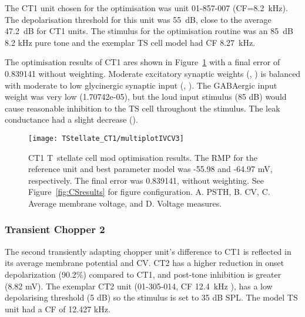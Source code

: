 The CT1 unit chosen for the optimisation was unit 01-857-007 \citep{PaoliniClareyEtAl:2005} (CF=8.2~kHz).
The depolarisation threshold for this unit was 55~dB, close to the average 47.2~dB for CT1 units.
The stimulus for the optimisation routine was an 85~dB 8.2 kHz pure tone and the exemplar TS cell model had CF 8.27~kHz.

The optimisation results of CT1 ares shown in Figure~\ref{fig:CT1results} with a final error of 0.839141 without weighting.
Moderate excitatory synaptic weights (, ) is balanced with moderate to low glycinergic synaptic input (, ).
The GABAergic input weight was very low (\wGLGTS 1.70742e-05), but the loud input stimulus (85 dB) would cause reasonable inhibition to the TS cell throughout the stimulus.
The leak conductance had a slight decrease ().


\begin{figure}[htb]
  \centering
\texttt{[image: TStellate\_CT1/multiplotIVCV3]}
  \caption[CT1 T~stellate Optimisation results]{CT1 T~stellate cell mod optimisation results.
The RMP for the reference unit and best parameter     model was -55.98 and -64.97 mV, respectively.
The final error was 0.839141,     without weighting.
See Figure~\ref{fig:CSresults} for figure configuration.
A. PSTH, B. CV, C. Average membrane voltage, and D. Voltage measures.}
  \label{fig:CT1results}
\end{figure}

\clearpage
\subsubsection{Transient Chopper 2}

The second transiently adapting chopper unit's difference to CT1 is reflected in its average membrane potential and CV.
CT2 has a higher reduction in onset depolarization (90.2\%) compared to CT1, and post-tone inhibition is greater (8.82 mV).
The exemplar CT2 unit (01-305-014, CF 12.4~kHz \citep*{PaoliniClareyEtAl:2005}), has a low depolarising threshold (5 dB) so the stimulus is set to 35 dB SPL. The model TS unit  had a CF of 12.427 kHz.


